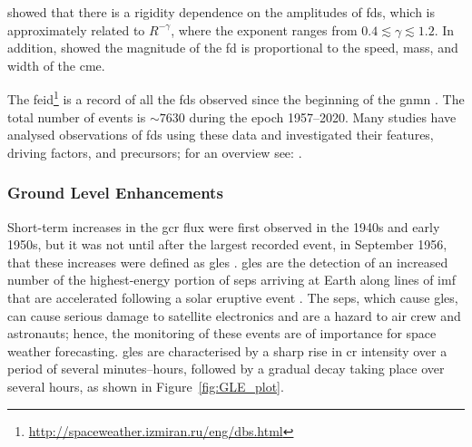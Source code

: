 \citet{lockwood_forbush_1971} showed that there is a rigidity dependence on the amplitudes of \glspl{fd}, which is approximately related to $R^{-\gamma}$, where the exponent ranges from $0.4\lesssim\gamma\lesssim1.2$. In addition, \citet{belov_what_2001, belov_coronal_2014} showed the magnitude of the \gls{fd} is proportional to the speed, mass, and width of the \gls{cme}. 


The \gls{feid}\footnote{\url{http://spaceweather.izmiran.ru/eng/dbs.html}} is a record of all the \glspl{fd} observed since the beginning of the \gls{gnmn} \citep{mishev_current_2020}. The total number of events is $\sim 7630$ during the epoch 1957--2020. Many studies have analysed observations of \glspl{fd} using these data and investigated their features, driving factors, and precursors; for an overview see: \citet{belov_what_2001, usoskin_forbush_2008, wawrzynczak_modeling_2010, rockenbach_global_2014, arunbabu_how_2015}.



\subsubsection*{Ground Level Enhancements}\label{sec:intro_GLEs}

Short-term increases in the \gls{gcr} flux were first observed in the 1940s and early 1950s, but it was not until after the largest recorded event, in September 1956, that these increases were defined as \glspl{gle} \citep{cramp_modelling_1996}. \glspl{gle} are the detection of an increased number of the highest-energy portion \cite[$> 500$~MeV,][]{kuwabara_development_2006} of \glspl{sep} arriving at Earth along lines of \gls{imf} that are accelerated following a solar eruptive event \citep{mccracken_high-energy_2012, poluianov_revisited_2017}. The \glspl{sep}, which cause \glspl{gle}, can cause serious damage to satellite electronics and are a hazard to air crew and astronauts; hence, the monitoring of these events are of importance for space weather forecasting. \glspl{gle} are characterised by a sharp rise in \gls{cr} intensity over a period of several minutes--hours, followed by a gradual decay taking place over several hours, as shown in Figure~\ref{fig:GLE_plot}. 

